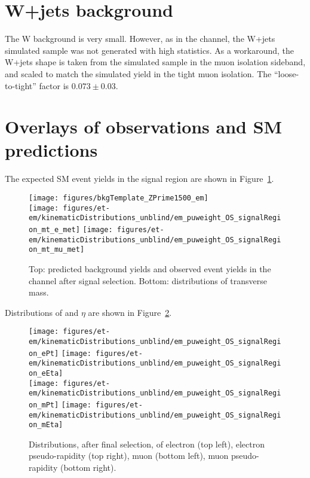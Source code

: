 \section{W+jets background}
\label{sec:em_w_bkg_validation}
The W background is very small.  However, as in the \teth channel, the
W+jets simulated sample was not generated with high statistics.  As a
workaround, the W+jets shape is taken from the simulated sample in the
muon isolation sideband, and scaled to match the simulated yield in
the tight muon isolation.  The ``loose-to-tight'' factor is
$0.073\pm0.03$.

\section{Overlays of observations and SM predictions}
\label{sec:em_overlays}

The expected SM event yields in the signal region are shown in
Figure~\ref{fig:em_sm_template_and_mt}.
\begin{figure}\centering
  \texttt{[image: figures/bkgTemplate\_ZPrime1500\_em]} \\
  \texttt{[image: figures/et-em/kinematicDistributions\_unblind/em\_puweight\_OS\_signalRegion\_mt\_e\_met]}
  \texttt{[image: figures/et-em/kinematicDistributions\_unblind/em\_puweight\_OS\_signalRegion\_mt\_mu\_met]}
  \caption{\label{fig:em_sm_template_and_mt} Top: predicted background
    yields and observed event yields in the \tetm channel after signal
    selection.  Bottom: distributions of transverse mass.}
\end{figure}

Distributions of \pt and $\eta$ are shown in Figure~\ref{fig:em_sr_pt_eta}.
\begin{figure}\centering
  \texttt{[image: figures/et-em/kinematicDistributions\_unblind/em\_puweight\_OS\_signalRegion\_ePt]}
  \texttt{[image: figures/et-em/kinematicDistributions\_unblind/em\_puweight\_OS\_signalRegion\_eEta]} \\
  \texttt{[image: figures/et-em/kinematicDistributions\_unblind/em\_puweight\_OS\_signalRegion\_mPt]}
  \texttt{[image: figures/et-em/kinematicDistributions\_unblind/em\_puweight\_OS\_signalRegion\_mEta]}
  \caption{\label{fig:em_sr_pt_eta} Distributions, after \tetm final
    selection, of electron \pt (top left), electron pseudo-rapidity
    (top right), muon \pt (bottom left), muon pseudo-rapidity (bottom
    right).}
\end{figure}
